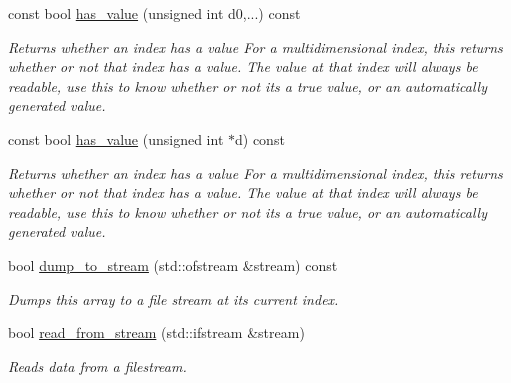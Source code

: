 \begin{DoxyCompactItemize}
const bool \hyperlink{classsisl_1_1sparse__array__n_a7db3ee8940017e21e3673641071f9654}{has\+\_\+value} (unsigned int d0,...) const
\begin{DoxyCompactList}\small\item\em Returns whether an index has a value For a multidimensional index, this returns whether or not that index has a value. The value at that index will always be readable, use this to know whether or not it\textquotesingle{}s a true value, or an automatically generated value. \end{DoxyCompactList}\item 
\mbox{\label{classsisl_1_1sparse__array__n_a7fc06154d0a6c469cab565d68876e637}} 
const bool \hyperlink{classsisl_1_1sparse__array__n_a7fc06154d0a6c469cab565d68876e637}{has\+\_\+value} (unsigned int $\ast$d) const
\begin{DoxyCompactList}\small\item\em Returns whether an index has a value For a multidimensional index, this returns whether or not that index has a value. The value at that index will always be readable, use this to know whether or not it\textquotesingle{}s a true value, or an automatically generated value. \end{DoxyCompactList}\item 
\mbox{\label{classsisl_1_1sparse__array__n_aa45b35c8068495755175df44e8b3c117}} 
bool \hyperlink{classsisl_1_1sparse__array__n_aa45b35c8068495755175df44e8b3c117}{dump\+\_\+to\+\_\+stream} (std\+::ofstream \&stream) const
\begin{DoxyCompactList}\small\item\em Dumps this array to a file stream at its current index. \end{DoxyCompactList}\item 
\mbox{\label{classsisl_1_1sparse__array__n_a76553311b73e61d9abc06b615f9997d6}} 
bool \hyperlink{classsisl_1_1sparse__array__n_a76553311b73e61d9abc06b615f9997d6}{read\+\_\+from\+\_\+stream} (std\+::ifstream \&stream)
\begin{DoxyCompactList}\small\item\em Reads data from a filestream. \end{DoxyCompactList}\end{DoxyCompactItemize}


